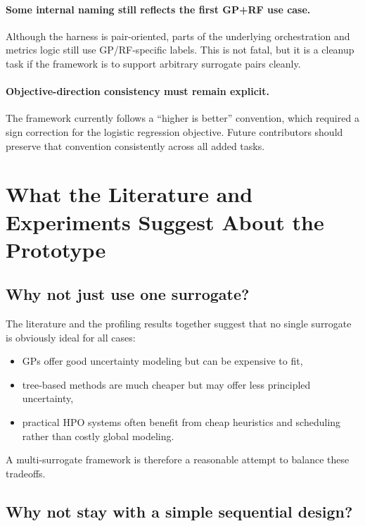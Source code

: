 \documentclass[11pt]{article}
\begin{document}
\paragraph{Some internal naming still reflects the first GP+RF use case.}
Although the harness is pair-oriented, parts of the underlying orchestration and metrics logic still use GP/RF-specific labels. This is not fatal, but it is a cleanup task if the framework is to support arbitrary surrogate pairs cleanly.

\paragraph{Objective-direction consistency must remain explicit.}
The framework currently follows a ``higher is better'' convention, which required a sign correction for the logistic regression objective. Future contributors should preserve that convention consistently across all added tasks.

\section{What the Literature and Experiments Suggest About the Prototype}

\subsection{Why not just use one surrogate?}

The literature and the profiling results together suggest that no single surrogate is obviously ideal for all cases:
\begin{itemize}[leftmargin=1.5em]
    \item GPs offer good uncertainty modeling but can be expensive to fit,
    \item tree-based methods are much cheaper but may offer less principled uncertainty,
    \item practical HPO systems often benefit from cheap heuristics and scheduling rather than costly global modeling.
\end{itemize}

A multi-surrogate framework is therefore a reasonable attempt to balance these tradeoffs.

\subsection{Why not stay with a simple sequential design?}
\end{document}
